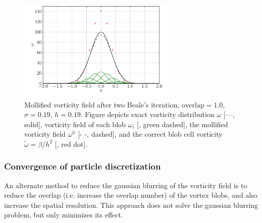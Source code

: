 	\begin{figure}[t]
	\centering
	\includegraphics[width=0.7\textwidth]{figures/lagrangian/bealesCorrection.pdf}
	\caption{Mollified vorticity field after two Beale's iteration, $\mathrm{overlap}=1.0$, $\sigma=0.19$, $h=0.19$. Figure depicts exact vorticity distribution $\omega$ [---, solid], vorticity field of each blob $\omega_i$ [{\color{plotGreen}{---}}, green dashed], the mollified vorticity field $\omega^h$ [- -, dashed], and the correct blob cell vorticity $\tilde{\omega}=\beta/h^2$ [{\color{plotRed}{$\bullet$}}, red dot].}
	\label{fig:bealesCorrection}
	\end{figure}

\subsubsection{Convergence of particle discretization}

An alternate method to reduce the gaussian blurring of the vorticity field is to reduce the overlap (i.e. increase the overlap number) of the vortex blobs, and also increase the spatial resolution. This approach does not solve the gaussian blurring problem, but only minimizes its effect.
	
